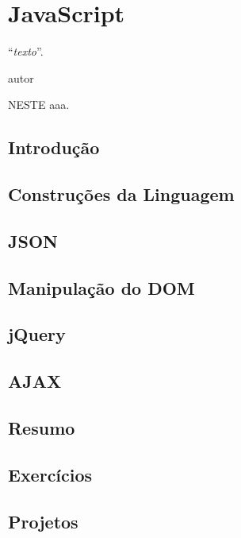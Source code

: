 \chapter{JavaScript}
\epigraph{``\textit{texto}''.}{autor}

\lettrine[lines=4, lhang=0.1, lraise=0, loversize=0.2, findent=0.1em]{\textcolor{corAzulTema}{N}}{ESTE} aaa.

\section{Introdução}

\section{Construções da Linguagem}

\section{JSON}

\section{Manipulação do DOM}

\section{jQuery}

\section{AJAX}

\section{Resumo}

\section{Exercícios}

\section{Projetos}
